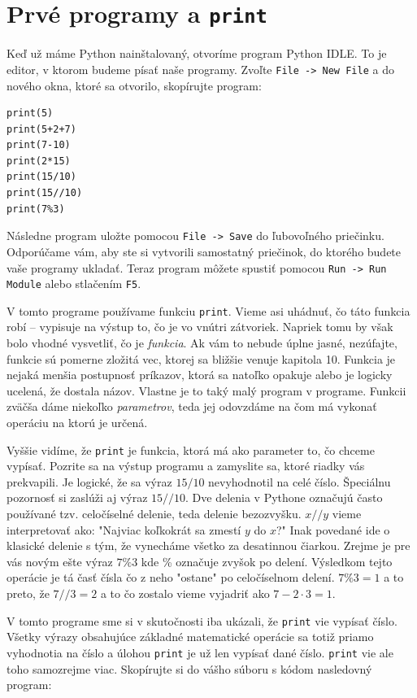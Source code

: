 \documentclass{article}
\begin{document}
\section{Prvé programy a \texttt{print}}
Keď už máme Python nainštalovaný, otvoríme program Python IDLE. To je editor, v ktorom budeme písať naše programy. Zvoľte \texttt{File -> New File} a do nového okna, ktoré sa otvorilo, skopírujte program:
\begin{lstlisting}
print(5)
print(5+2+7)
print(7-10)
print(2*15)
print(15/10)
print(15//10)
print(7%3)
\end{lstlisting}
Následne program uložte pomocou \texttt{File -> Save} do ľubovoľného priečinku. Odporúčame vám, aby ste si vytvorili samostatný priečinok, do ktorého budete vaše programy ukladať. Teraz program môžete spustiť pomocou \texttt{Run -> Run Module} alebo stlačením \texttt{F5}. 

V tomto programe používame funkciu \texttt{print}. Vieme asi uhádnuť, čo táto funkcia robí -- vypisuje na výstup to, čo je vo vnútri zátvoriek. Napriek tomu by však bolo vhodné vysvetliť, čo je \textit{funkcia}. Ak vám to nebude úplne jasné, nezúfajte, funkcie sú pomerne zložitá vec, ktorej sa bližšie venuje kapitola 10.
Funkcia je nejaká menšia postupnosť príkazov, ktorá sa natoľko opakuje alebo je logicky ucelená, že dostala názov. Vlastne je to taký malý program v programe. Funkcii zväčša dáme niekoľko \textit{parametrov}, teda jej odovzdáme na čom má vykonať operáciu na ktorú je určená.

Vyššie vidíme, že \texttt{print} je funkcia, ktorá má ako parameter to, čo chceme vypísať. Pozrite sa na výstup programu a zamyslite sa, ktoré riadky vás prekvapili. Je logické, že sa výraz $15 / 10$ nevyhodnotil na celé číslo. Špeciálnu pozornosť si zaslúži aj výraz $15 // 10$. Dve delenia v Pythone označujú často používané tzv. celočíselné delenie, teda delenie bezozvyšku. $x // y$ vieme interpretovať ako: "Najviac koľkokrát sa zmestí $y$ do $x$?" Inak povedané ide o klasické delenie s tým, že vynecháme všetko za desatinnou čiarkou.
Zrejme je pre vás novým ešte výraz $7 \% 3$ kde \% označuje zvyšok po delení. Výsledkom tejto operácie je tá časť čísla čo z neho "ostane" po celočíselnom delení. $7\%3=1$ a to preto, že $7//3=2$ a to čo zostalo vieme vyjadriť ako $7 - 2 \cdot 3 = 1$.

V tomto programe sme si v skutočnosti iba ukázali, že \texttt{print} vie vypísať číslo. Všetky výrazy obsahujúce základné matematické operácie sa totiž priamo vyhodnotia na číslo a úlohou \texttt{print} je už len vypísať dané číslo. \texttt{print} vie ale toho samozrejme viac. Skopírujte si do vášho súboru s kódom nasledovný program:
\end{document}
